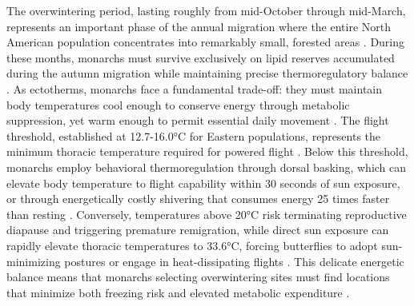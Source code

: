 The overwintering period, lasting roughly from mid-October through mid-March, represents an important phase of the annual migration where the entire North American population concentrates into remarkably small, forested areas \parencite{solenskyOverviewMonarchMigration2004,vidalDynamicsTrendsOverwintering2014,jepsenUnderstandingConservingWestern2015}. During these months, monarchs must survive exclusively on lipid reserves accumulated during the autumn migration while maintaining precise thermoregulatory balance \parencite{chaplinEnergyReservesMetabolic1982,mastersMonarchButterflyDanaus1988}. As ectotherms, monarchs face a fundamental trade-off: they must maintain body temperatures cool enough to conserve energy through metabolic suppression, yet warm enough to permit essential daily movement \parencite{mastersMonarchButterflyDanaus1988,chaplinEnergyReservesMetabolic1982,kammerThoracicTemperatureShivering1970,alonso-mejiaInfluenceTemperatureSurface1992}. The flight threshold, established at 12.7-16.0°C for Eastern populations, represents the minimum thoracic temperature required for powered flight \parencite{mastersMonarchButterflyDanaus1988}. Below this threshold, monarchs employ behavioral thermoregulation through dorsal basking, which can elevate body temperature to flight capability within 30 seconds of sun exposure, or through energetically costly shivering that consumes energy 25 times faster than resting \parencite{mastersMonarchButterflyDanaus1988}. Conversely, temperatures above 20°C risk terminating reproductive diapause and triggering premature remigration, while direct sun exposure can rapidly elevate thoracic temperatures to 33.6°C, forcing butterflies to adopt sun-minimizing postures or engage in heat-dissipating flights \parencite{barkerEffectPhotoperiodTemperature1976,barkerEffectPhotoperiodTemperature1976}. This delicate energetic balance means that monarchs selecting overwintering sites must find locations that minimize both freezing risk and elevated metabolic expenditure \parencite{mastersMonarchButterflyDanaus1988,alonso-mejiaInfluenceTemperatureSurface1992,calvertEffectRainSnow1983}.

